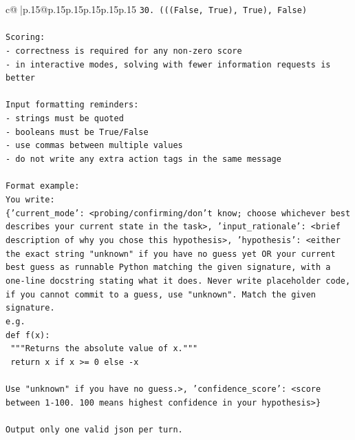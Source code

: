\documentclass{article}
\begin{document}
{\begin{supertabular}{c@{$\;$}|p{.15\linewidth}@{}p{.15\linewidth}p{.15\linewidth}p{.15\linewidth}p{.15\linewidth}p{.15\linewidth}}
{{{\texttt{30. (((False, True), True), False)} \\
\\ 
\texttt{Scoring:} \\
\texttt{{-} correctness is required for any non{-}zero score} \\
\texttt{{-} in interactive modes, solving with fewer information requests is better} \\
\\ 
\texttt{Input formatting reminders:} \\
\texttt{{-} strings must be quoted} \\
\texttt{{-} booleans must be True/False} \\
\texttt{{-} use commas between multiple values} \\
\texttt{{-} do not write any extra action tags in the same message} \\
\\ 
\texttt{Format example:} \\
\texttt{You write:} \\
\texttt{\{'current\_mode': <probing/confirming/don't know; choose whichever best describes your current state in the task>, 'input\_rationale': <brief description of why you chose this hypothesis>, 'hypothesis': <either the exact string "unknown" if you have no guess yet OR your current best guess as runnable Python matching the given signature, with a one{-}line docstring stating what it does. Never write placeholder code, if you cannot commit to a guess, use "unknown". Match the given signature.} \\
\texttt{e.g.} \\
\texttt{def f(x):} \\
\texttt{	"""Returns the absolute value of x."""} \\
\texttt{	return x if x >= 0 else {-}x} \\
\\ 
\texttt{Use "unknown" if you have no guess.>, 'confidence\_score': <score between 1{-}100. 100 means highest confidence in your hypothesis>\}} \\
\\ 
\texttt{Output only one valid json per turn.} \\
            }
        }
    }
     \\ \\


\end{supertabular}}
\end{document}
